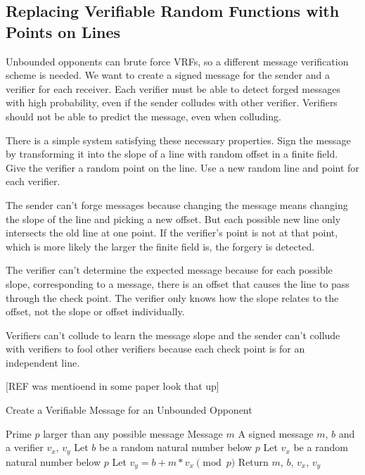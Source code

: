 \documentclass{dalcsthesis}
\begin{document}
\subsection{Replacing Verifiable Random Functions with Points on Lines}

Unbounded opponents can brute force VRFs, so a different message verification scheme is needed. We want to create a signed message for the sender and a verifier for each receiver. Each verifier must be able to detect forged messages with high probability, even if the sender colludes with other verifier. Verifiers should not be able to predict the message, even when colluding.

There is a simple system satisfying these necessary properties. Sign the message by transforming it into the slope of a line with random offset in a finite field. Give the verifier a random point on the line. Use a new random line and point for each verifier.

The sender can't forge messages because changing the message means changing the slope of the line and picking a new offset. But each possible new line only intersects the old line at one point. If the verifier's point is not at that point, which is more likely the larger the finite field is, the forgery is detected.

The verifier can't determine the expected message because for each possible slope, corresponding to a message, there is an offset that causes the line to pass through the check point. The verifier only knows how the slope relates to the offset, not the slope or offset individually.

Verifiers can't collude to learn the message slope and the sender can't collude with verifiers to fool other verifiers because each check point is for an independent line.

[REF was mentioend in some paper look that up]

\begin{algorithm}
  \caption{Create a Verifiable Message for an Unbounded Opponent}
  \label{alg:CreatingVerifiableMessageForUnbounded}
  \begin{algorithmic}[1]
    \INPUT Prime $p$ larger than any possible message
    \INPUT Message $m$
    \OUTPUT A signed message $m$, $b$ and a verifier $v_x$, $v_y$
    \STATE Let $b$ be a random natural number below $p$ 
    \STATE Let $v_x$ be a random natural number below $p$
    \STATE Let $v_y = b + m*v_x \pmod{p}$
    \STATE Return $m$, $b$, $v_x$, $v_y$
  \end{algorithmic}
\end{algorithm}
\end{document}
